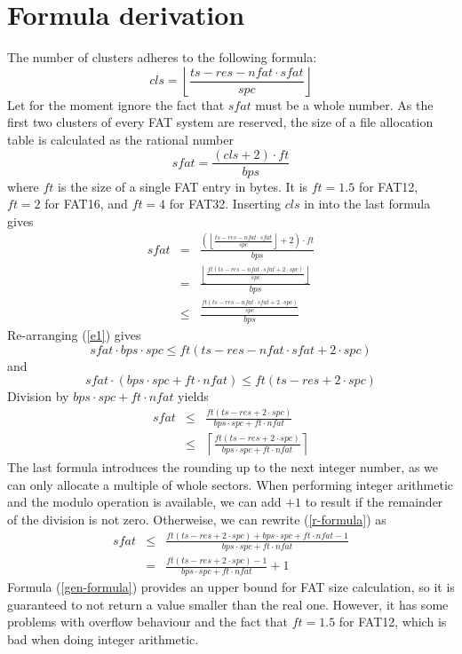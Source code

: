 \documentclass[12pt]{article}
\begin{document}
\section{Formula derivation}
The number of clusters adheres to the following formula:
\begin{equation}
cls = \left\lfloor\frac{ts - res - nfat \cdot sfat}{spc}\right\rfloor
\end{equation}
Let for the moment ignore the fact that $sfat$ must be a whole number. As the first two clusters of every FAT system are reserved, the size of a file allocation table is calculated as the rational number
\begin{equation}
sfat = \frac{(cls + 2) \cdot ft}{bps}
\end{equation}
where $ft$ is the size of a single FAT entry in bytes. It is $ft = 1.5$ for FAT12, $ft = 2$ for FAT16, and $ft = 4$ for FAT32. Inserting $cls$ in into the last formula gives
\begin{eqnarray}
sfat &=& \frac{\left(\left\lfloor\frac{ts - res - nfat \cdot sfat}{spc}\right\rfloor + 2\right) \cdot ft}{bps} \nonumber\\
 &=& \frac{\left\lfloor\frac{ft(ts - res - nfat \cdot sfat +2 \cdot spc)}{spc}\right\rfloor}{bps}\\
 \label{e1}
 &\le& \frac{\frac{ft(ts - res - nfat \cdot sfat +2 \cdot spc)}{spc}}{bps}
\end{eqnarray}
Re-arranging (\ref{e1}) gives
\begin{equation*}
sfat \cdot bps \cdot spc \le ft(ts - res - nfat \cdot sfat +2 \cdot spc)
\end{equation*}
and
\begin{equation*}
sfat \cdot (bps \cdot spc + ft \cdot nfat) \le ft(ts - res + 2 \cdot spc)
\end{equation*}
Division by $bps \cdot spc + ft \cdot nfat$ yields
\begin{eqnarray}
sfat &\le& \frac{ft(ts - res + 2 \cdot spc)}{bps \cdot spc + ft \cdot nfat}\nonumber\\
\label{r-formula}
 &\le& \left\lceil\frac{ft(ts - res + 2 \cdot spc)}{bps \cdot spc + ft \cdot nfat}\right\rceil
\end{eqnarray}
The last formula introduces the rounding up to the next integer number, as we can only allocate a multiple of whole sectors. When performing integer arithmetic and the modulo operation is available, we can add $+1$ to result if the remainder of the division is not zero. Otherweise, we can rewrite (\ref{r-formula}) as
\begin{eqnarray}
sfat &\le& \frac{ft(ts - res + 2 \cdot spc) + bps \cdot spc + ft \cdot nfat - 1}{bps \cdot spc + ft \cdot nfat} \nonumber\\
\label{gen-formula}
 &=& \frac{ft(ts - res + 2 \cdot spc) - 1}{bps \cdot spc + ft \cdot nfat} + 1
\end{eqnarray}
Formula (\ref{gen-formula}) provides an upper bound for FAT size calculation, so it is guaranteed to not return a value smaller than the real one. However, it has some problems with overflow behaviour and the fact that $ft = 1.5$ for FAT12, which is bad when doing integer arithmetic.
 
\end{document}
